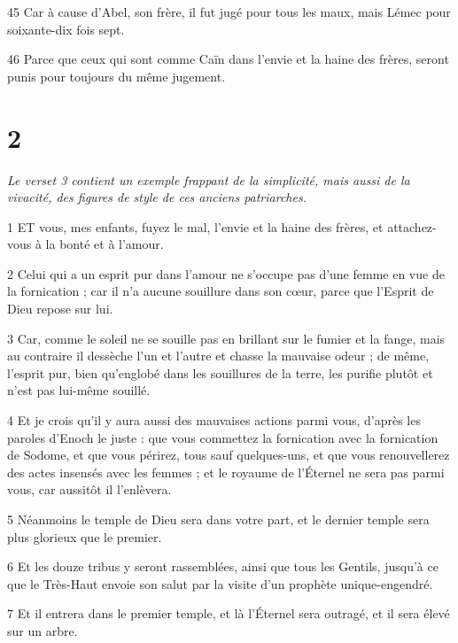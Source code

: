 \par 45 Car à cause d'Abel, son frère, il fut jugé pour tous les maux, mais Lémec pour soixante-dix fois sept.

\par 46 Parce que ceux qui sont comme Caïn dans l'envie et la haine des frères, seront punis pour toujours du même jugement.

\chapter{2}

\par \textit{Le verset 3 contient un exemple frappant de la simplicité, mais aussi de la vivacité, des figures de style de ces anciens patriarches.}

\par 1 ET vous, mes enfants, fuyez le mal, l'envie et la haine des frères, et attachez-vous à la bonté et à l'amour.

\par 2 Celui qui a un esprit pur dans l'amour ne s'occupe pas d'une femme en vue de la fornication ; car il n'a aucune souillure dans son cœur, parce que l'Esprit de Dieu repose sur lui.

\par 3 Car, comme le soleil ne se souille pas en brillant sur le fumier et la fange, mais au contraire il dessèche l'un et l'autre et chasse la mauvaise odeur ; de même, l'esprit pur, bien qu'englobé dans les souillures de la terre, les purifie plutôt et n'est pas lui-même souillé.

\par 4 Et je crois qu'il y aura aussi des mauvaises actions parmi vous, d'après les paroles d'Enoch le juste : que vous commettez la fornication avec la fornication de Sodome, et que vous périrez, tous sauf quelques-uns, et que vous renouvellerez des actes insensés avec les femmes ; et le royaume de l'Éternel ne sera pas parmi vous, car aussitôt il l'enlèvera.

\par 5 Néanmoins le temple de Dieu sera dans votre part, et le dernier temple sera plus glorieux que le premier.

\par 6 Et les douze tribus y seront rassemblées, ainsi que tous les Gentils, jusqu'à ce que le Très-Haut envoie son salut par la visite d'un prophète unique-engendré.

\par 7 Et il entrera dans le premier temple, et là l'Éternel sera outragé, et il sera élevé sur un arbre.

